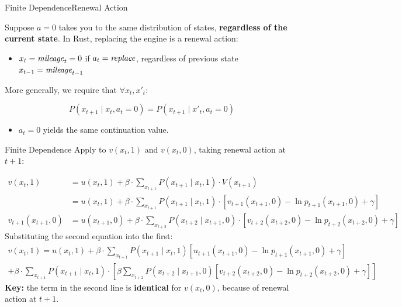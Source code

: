 \documentclass[11pt,aspectratio=169]{beamer}
\begin{document}
\begin{frame}{Finite Dependence}{Renewal Action}


Suppose $a=0$ takes you to the same distribution of states, \textbf{regardless of the current state}. In Rust, replacing the engine is a renewal action:
    \begin{itemize}
      \item $x_t = \text{\textit{mileage}}_t = 0$ if $a_t=\text{\textit{replace}}$, regardless of previous state $x_{t-1}=\text{\textit{mileage}}_{t-1}$
    \end{itemize}

\vspace{0.5cm}

More generally, we require that $\forall x_t,x'_t$: 

    $$ P(x_{t+1} \mid x_t,a_t=0) = P(x_{t+1} \mid x'_t,a_t=0) $$

    \begin{itemize} 
      \item[$\rightarrow$] $a_t=0$ yields the same continuation value.
    \end{itemize}

\end{frame}


\begin{frame}{Finite Dependence}
\vspace{-0.5cm}
Apply to $v(x_t,1)$ and $v(x_t,0)$, taking renewal action at $t+1$:

\vspace{-0.2cm}
\footnotesize
\begin{align*}
v(x_t,1) & = u(x_t,1) + \beta\cdot \sum_{x_{t+1}} P(x_{t+1} \mid x_t,1)\cdot V(x_{t+1})  \\
         & = u(x_t,1) + \beta\cdot \sum_{x_{t+1}} P(x_{t+1} \mid x_t,1)\cdot [v_{t+1}(x_{t+1},0) - \ln p_{t+1}(x_{t+1},0) + \gamma] \\
v_{t+1}(x_{t+1},0) & = u(x_{t+1},0) + \beta\cdot \sum_{x_{t+2}} P(x_{t+2} \mid x_{t+1},0)\cdot [v_{t+2}(x_{t+2},0) - \ln p_{t+2}(x_{t+2},0) + \gamma]
\end{align*}
\normalsize
Substituting the second equation into the first:
\footnotesize
\begin{multline*}
v(x_t,1) = u(x_t,1) + \beta\cdot \sum_{x_{t+1}} P(x_{t+1} \mid x_t,1)[u_{t+1}(x_{t+1},0) - \ln p_{t+1}(x_{t+1},0) + \gamma] \\ 
 + \beta\cdot \sum_{x_{t+1}} P(x_{t+1} \mid x_t,1)\cdot \left[ \beta \sum_{x_{t+2}} P(x_{t+2} \mid x_{t+1},0) [v_{t+2}(x_{t+2},0) - \ln p_{t+2}(x_{t+2},0) + \gamma] \right]
 \end{multline*}
\normalsize
\medskip
\textbf{Key:} the term in the second line is \textbf{identical} for $v(x_t,0)$, because of renewal action at $t+1$.

\end{frame}
\end{document}
